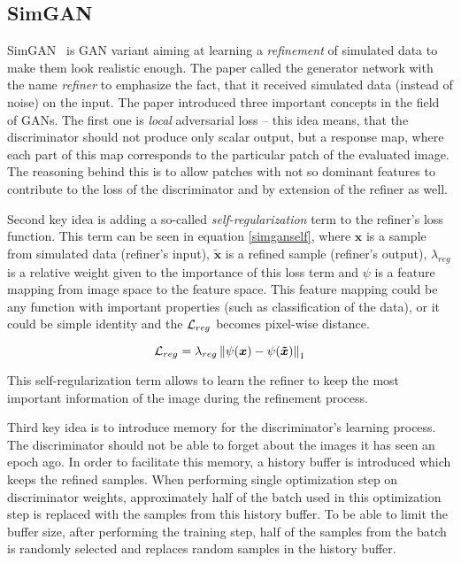 \subsection{SimGAN}

SimGAN~\cite{historypool} is GAN variant aiming at learning a {\em refinement} of simulated data to make them look realistic enough. The paper called the generator network with the name {\em refiner} to emphasize the fact, that it received simulated data (instead of noise) on the input. The paper introduced three important concepts in the field of GANs. The first one is {\em local} adversarial loss -- this idea means, that the discriminator should not produce only scalar output, but a response map, where each part of this map corresponds to the particular patch of the evaluated image. The reasoning behind this is to allow patches with not so dominant features to contribute to the loss of the discriminator and by extension of the refiner as well.

Second key idea is adding a so-called {\em self-regularization} term to the refiner's loss function. This term can be seen in equation \ref{simganself}, where $\bm{x}$ is a sample from simulated data (refiner's input), $\bm{\tilde{x}}$ is a refined sample (refiner's output), $\lambda_{reg}$ is a relative weight given to the importance of this loss term and $\psi$ is a feature mapping from image space to the feature space. This feature mapping could be any function with important properties (such as classification of the data), or it could be simple identity and the $\mathcal{L}_{reg}$ becomes pixel-wise distance.

\begin{equation}
\mathcal{L}_{reg} = \lambda_{reg}\left\lVert\psi({\bm{x}}) - \psi({\bm{\tilde{x}}})\right\rVert_1
\label{simganself}
\end{equation}

This self-regularization term allows to learn the refiner to keep the most important information of the image during the refinement process.

Third key idea is to introduce memory for the discriminator's learning process. The discriminator should not be able to forget about the images it has seen an epoch ago. In order to facilitate this memory, a history buffer is introduced which keeps the refined samples. When performing single optimization step on discriminator weights, approximately half of the batch used in this optimization step is replaced with the samples from this history buffer. To be able to limit the buffer size, after performing the training step, half of the samples from the batch is randomly selected and replaces random samples in the history buffer.

